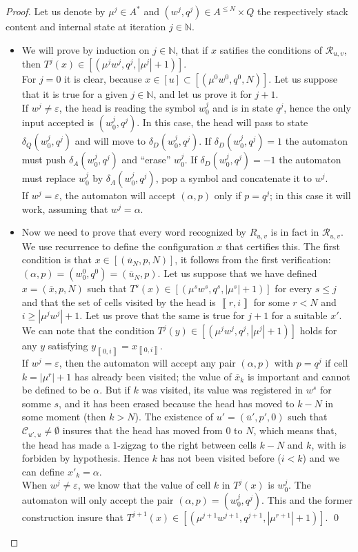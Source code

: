 \documentclass{llncs}
\newcommand{\Nset}{{\mathbb N}}
\newcommand{\length}[1]{\left|#1\right|}
\newcommand{\co}[2]{\left\llbracket #1,#2\right\llbracket}\newcommand{\cc}[2]{\left\llbracket #1,#2\right\rrbracket}\newcommand{\oo}[2]{\left\rrbracket #1,#2\right\llbracket}\newcommand{\oc}[2]{\left\rrbracket #1,#2\right\rrbracket}\newcommand{\ci}[1]{\co{#1}\infty}\newcommand{\io}[1]{\oo{-\infty}{#1}}\newcommand{\oi}[1]{\oo{#1}\infty}\newcommand{\ic}[1]{\oc{-\infty}{#1}}
\newcommand{\scc}[2]{_{\cc{#1}{#2}}}\newcommand{\sco}[2]{_{\co{#1}{#2}}}\newcommand{\soo}[2]{_{\oo{#1}{#2}}}\newcommand{\soc}[2]{_{\oc{#1}{#2}}}\newcommand{\sci}[1]{_{\ci{#1}}}\newcommand{\sio}[1]{_{\io{#1}}}\newcommand{\soi}[1]{_{\oi{#1}}}\newcommand{\sic}[1]{_{\ic{#1}}}
\begin{document}
\begin{proof}
Let us denote by $\mu^j\in A^*$ and $(w^j,q^j)\in A^{\le N}\times Q$ the respectively stack content and internal state at iteration $j\in\Nset$.
\begin{itemize}
\item
We will prove by induction on $j\in\Nset$, that if $x$ satifies the conditions of $\mathcal R_{u,v}$, then $T^j(x) \in [(\mu^j w^j,q^j,\length{\mu^j}+1)]$.
\\
For $j=0$ it is clear, because $x\in [u] \subset [(\mu^0w^0,q^0,N)]$.
Let us suppose that it is true for a given $j\in\Nset$, and let us prove it for $j+1$.
\\
If $w^j\ne\varepsilon$, the head is reading the symbol $w^j_0$ and is in state $q^j$, hence the only input accepted is $(w^j_0,q^j)$.
In this case, the head will pass to state $\delta_Q(w^j_0,q^j)$ and will move to $\delta_D(w^j_0,q^j)$.
If $\delta_D(w^j_0,q^j)=1$ the automaton must push $\delta_A(w^j_0,q^j)$ and ``erase'' $w^j_0$.
If $\delta_D(w^j_0,q^j)=-1$ the automaton must replace $w^j_0$ by $\delta_A(w^j_0,q^j)$, pop a symbol and concatenate it to $w^j$.
\\
If $w^{j}=\varepsilon$, the automaton will accept $(\alpha,p)$ only if $p=q^j$; in this case it will work, assuming that $w^{j}=\alpha$.
\item
Now we need to prove that every word recognized by $R_{u,v}$ is in fact in $\mathcal R_{u,v}$.
We use recurrence to define the configuration $x$ that certifies this.
The first condition is that $x\in [(\overline{u}_N,p,N)]$, it follows from the first verification: $(\alpha,p) = (w^0_0,q^0) = (\overline{u}_N,p)$.
Let us suppose that we have defined $x=(\overline x,p,N)$ such that $T^s(x) \in [(\mu^s w^s,q^s,\length{\mu^s}+1)]$ for every $s\le j$ and that the set of cells visited by the head is $\cc ri$ for some $r<N$ and $i\ge\length{\mu^jw^j}+1$.
Let us prove that the same is true for $j+1$ for a suitable $x'$.
We can note that the condition $T^j(y) \in [(\mu^j w^j,q^j,\length{\mu^j}+1)]$ holds for any $y$ satisfying $y\scc0i=x\scc0i$.
\\
If $w^j=\varepsilon$, then the automaton will accept any pair $(\alpha,p)$ with $p=q^j$ if cell $k=\length{\mu^r}+1$ has already been visited; the value of $\overline{x}_k$ is important and cannot be defined to be $\alpha$. But if $k$ was visited, its value was registered in $w^s$ for somme $s$, and it has been erased because the head has moved to $k-N$ in some moment (then $k>N$).
The existence of $u' = (\overline{u}',p',0)$ such that $\mathcal C_{u',u} \ne\emptyset$ insures that the head has moved from $0$ to $N$, which means that, the head has made a $1$-zigzag to the right between cells $k-N$ and $k$, with is forbiden by hypothesis. Hence $k$ has not been visited before ($i<k$) and we can define $x'_k=\alpha$.
\\
When $w^j\ne\varepsilon$, we know that the value of cell $k$ in $T^j(x)$ is $w^j_0$. The automaton will only accept the pair $(\alpha,p) = (w^j_0,q^j)$.
This and the former construction insure that $T^{j+1}(x) \in [(\mu^{j+1} w^{j+1},q^{j+1},\length{\mu^{r+1}}+1)]$.
\qed\end{itemize}\end{proof}
\end{document}
